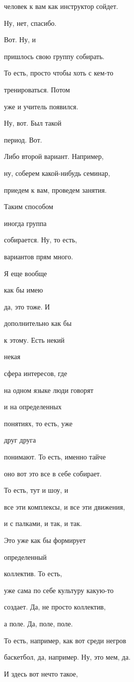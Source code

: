 человек к вам как инструктор сойдет.

Ну, нет, спасибо.

Вот. Ну, и

пришлось свою группу собирать.

То есть, просто чтобы хоть с кем-то

тренироваться. Потом

уже и учитель появился.

Ну, вот. Был такой

период. Вот.

Либо второй вариант. Например,

ну, соберем какой-нибудь семинар,

приедем к вам, проведем занятия.

Таким способом

иногда группа

собирается. Ну, то есть,

вариантов прям много.

Я еще вообще

как бы имею

да, это тоже. И

дополнительно как бы

к этому. Есть некий

некая

сфера интересов, где

на одном языке люди говорят

и на определенных

понятиях, то есть, уже

друг друга

понимают. То есть, именно тайче

оно вот это все в себе собирает.

То есть, тут и шоу, и

все эти комплексы, и все эти движения,

и с палками, и так, и так.

Это уже как бы формирует

определенный

коллектив. То есть,

уже сама по себе культуру какую-то

создает. Да, не просто коллектив,

а поле. Да, поле, поле.

То есть, например, как вот среди негров

баскетбол, да, например. Ну, это мем, да.

И здесь вот нечто такое,

